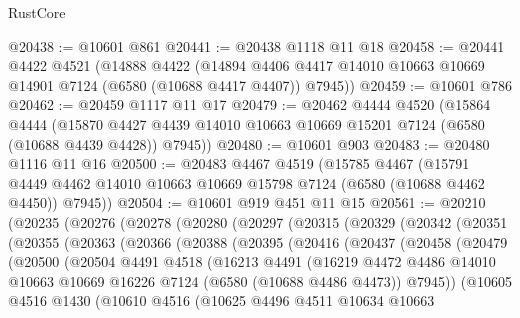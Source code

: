 \begin{lexlean}{RustCore}
\begin{coremodule}
@20438 := @10601 @861
@20441 := @20438 @1118 @11 @18
@20458 := @20441
    @4422
    @4521
    (@14888
      @4422
      (@14894 @4406 @4417 @14010 @10663 @10669 @14901 @7124 (@6580 (@10688 @4417 @4407)) @7945))
@20459 := @10601 @786
@20462 := @20459 @1117 @11 @17
@20479 := @20462
    @4444
    @4520
    (@15864
      @4444
      (@15870 @4427 @4439 @14010 @10663 @10669 @15201 @7124 (@6580 (@10688 @4439 @4428)) @7945))
@20480 := @10601 @903
@20483 := @20480 @1116 @11 @16
@20500 := @20483
    @4467
    @4519
    (@15785
      @4467
      (@15791 @4449 @4462 @14010 @10663 @10669 @15798 @7124 (@6580 (@10688 @4462 @4450)) @7945))
@20504 := @10601 @919 @451 @11 @15
@20561 := @20210
    (@20235
      (@20276
        (@20278
          (@20280
            (@20297
              (@20315
                (@20329
                  (@20342
                    (@20351
                      (@20355
                        (@20363
                          (@20366
                            (@20388
                              (@20395
                                (@20416
                                  (@20437
                                    (@20458
                                      (@20479
                                        (@20500
                                          (@20504
                                            @4491
                                            @4518
                                            (@16213
                                              @4491
                                              (@16219
                                                @4472
                                                @4486
                                                @14010
                                                @10663
                                                @10669
                                                @16226
                                                @7124
                                                (@6580 (@10688 @4486 @4473))
                                                @7945))
                                            (@10605
                                              @4516
                                              @1430
                                              (@10610
                                                @4516
                                                (@10625
                                                  @4496
                                                  @4511
                                                  @10634
                                                  @10663

\end{coremodule}
\end{lexlean}
